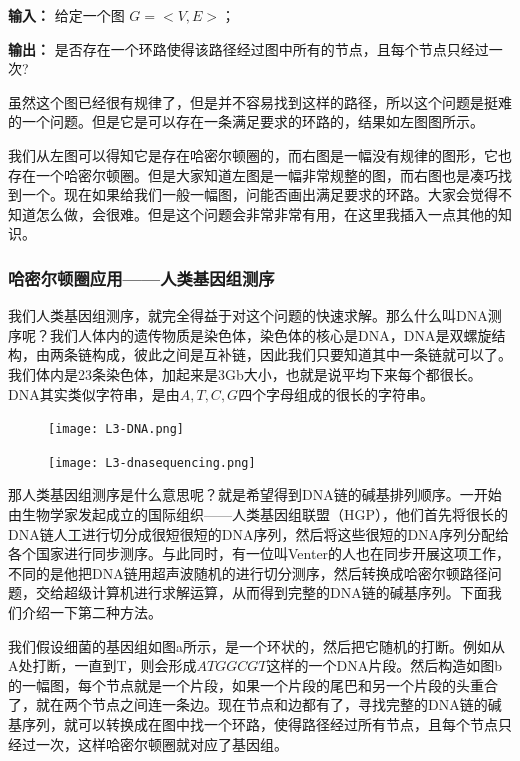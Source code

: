 {\bf 输入：} 给定一个图 $G=<V,E>$；

{\bf 输出：} 是否存在一个环路使得该路径经过图中所有的节点，且每个节点只经过一次?

虽然这个图已经很有规律了，但是并不容易找到这样的路径，所以这个问题是挺难的一个问题。但是它是可以存在一条满足要求的环路的，结果如左图图所示。

\begin{figure}[H]
\centering
\end{figure}

我们从左图可以得知它是存在哈密尔顿圈的，而右图是一幅没有规律的图形，它也存在一个哈密尔顿圈。但是大家知道左图是一幅非常规整的图，而右图也是凑巧找到一个。现在如果给我们一般一幅图，问能否画出满足要求的环路。大家会觉得不知道怎么做，会很难。但是这个问题会非常非常有用，在这里我插入一点其他的知识。

\subsubsection{哈密尔顿圈应用——人类基因组测序}

我们人类基因组测序，就完全得益于对这个问题的快速求解。那么什么叫DNA测序呢？我们人体内的遗传物质是染色体，染色体的核心是DNA，DNA是双螺旋结构，由两条链构成，彼此之间是互补链，因此我们只要知道其中一条链就可以了。我们体内是23条染色体，加起来是3Gb大小，也就是说平均下来每个都很长。DNA其实类似字符串，是由$A,T,C,G$四个字母组成的很长的字符串。

\begin{figure}[H]
\centering
 \texttt{[image: L3-DNA.png]}
\end{figure}
\begin{figure}[H]
\centering
 \texttt{[image: L3-dnasequencing.png]}
\end{figure}

那人类基因组测序是什么意思呢？就是希望得到DNA链的碱基排列顺序。一开始由生物学家发起成立的国际组织——人类基因组联盟（HGP），他们首先将很长的DNA链人工进行切分成很短很短的DNA序列，然后将这些很短的DNA序列分配给各个国家进行同步测序。与此同时，有一位叫Venter的人也在同步开展这项工作，不同的是他把DNA链用超声波随机的进行切分测序，然后转换成哈密尔顿路径问题，交给超级计算机进行求解运算，从而得到完整的DNA链的碱基序列。下面我们介绍一下第二种方法。

我们假设细菌的基因组如图a所示，是一个环状的，然后把它随机的打断。例如从A处打断，一直到T，则会形成$ATGGCGT$这样的一个DNA片段。然后构造如图b的一幅图，每个节点就是一个片段，如果一个片段的尾巴和另一个片段的头重合了，就在两个节点之间连一条边。现在节点和边都有了，寻找完整的DNA链的碱基序列，就可以转换成在图中找一个环路，使得路径经过所有节点，且每个节点只经过一次，这样哈密尔顿圈就对应了基因组。

